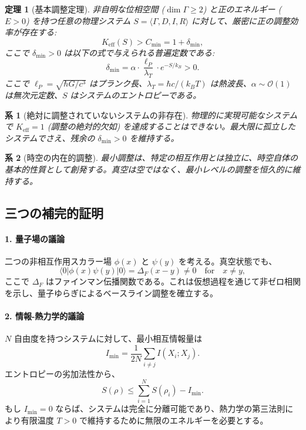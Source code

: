 \documentclass[11pt,a4paper]{article}
\newtheorem{theorem}{定理}
\newtheorem{corollary}{系}
\begin{document}
	\begin{theorem}[基本調整定理]
		非自明な位相空間 ($\dim\Gamma \geq 2$) と正のエネルギー ($E > 0$) を持つ任意の物理システム $S = \langle \Gamma, D, I, R \rangle$ に対して、厳密に正の調整効率が存在する:
		\begin{equation}
			\boxed{K_{\mathrm{eff}}(S) > C_{\min} = 1 + \delta_{\min}},
		\end{equation}
		ここで $\delta_{\min} > 0$ は以下の式で与えられる普遍定数である:
		\begin{equation}
			\delta_{\min} = \alpha \cdot \frac{\ell_P}{\lambda_T} \cdot e^{-S/k_B} > 0.
			\label{eq:delta-min}
		\end{equation}
		ここで $\ell_P = \sqrt{\hbar G / c^3}$ はプランク長、$\lambda_T = \hbar c / (k_B T)$ は熱波長、$\alpha \sim \mathcal{O}(1)$ は無次元定数、$S$ はシステムのエントロピーである。
	\end{theorem}
	
	\begin{corollary}[絶対に調整されていないシステムの非存在]
		物理的に実現可能なシステムで $K_{\mathrm{eff}} = 1$ (調整の絶対的欠如) を達成することはできない。最大限に孤立したシステムでさえ、残余の $\delta_{\min} > 0$ を維持する。
	\end{corollary}
	
	\begin{corollary}[時空の内在的調整]
		最小調整は、特定の相互作用とは独立に、時空自体の基本的性質として創発する。真空は空ではなく、最小レベルの調整を恒久的に維持する。
	\end{corollary}
	
	\subsection{三つの補完的証明}
	
	\paragraph*{1. 量子場の議論}
	二つの非相互作用スカラー場 $\phi(x)$ と $\psi(y)$ を考える。真空状態でも、
	\[
	\langle 0 | \phi(x) \psi(y) | 0 \rangle = \Delta_F(x-y) \neq 0 \quad \text{for} \quad x \neq y,
	\]
	ここで $\Delta_F$ はファインマン伝播関数である。これは仮想過程を通じて非ゼロ相関を示し、量子ゆらぎによるベースライン調整を確立する。
	
	\paragraph*{2. 情報-熱力学的議論}
	$N$ 自由度を持つシステムに対して、最小相互情報量は
	\[
	I_{\min} = \frac{1}{2N} \sum_{i \neq j} I(X_i; X_j).
	\]
	エントロピーの劣加法性から、
	\[
	S(\rho) \leq \sum_{i=1}^N S(\rho_i) - I_{\min}.
	\]
	もし $I_{\min}=0$ ならば、システムは完全に分離可能であり、熱力学の第三法則により有限温度 $T>0$ で維持するために無限のエネルギーを必要とする。
	
\end{document}
